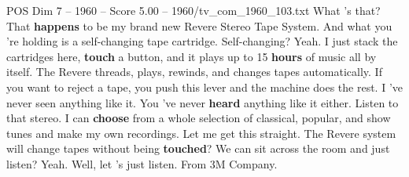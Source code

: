 \begin{textsample}{POS Dim 7 – 1960 – Score 5.00 – 1960/tv\_com\_1960\_103.txt}  \label{ex:f7_pos_022}
What 's that?
That \textbf{happens} to be my brand new Revere Stereo Tape System.
And what you 're holding is a self-changing tape cartridge.
Self-changing?
Yeah.
I just stack the cartridges here, \textbf{touch} a button, and it plays up to 15 \textbf{hours} of music all by itself.
The Revere threads, plays, rewinds, and changes tapes automatically.
If you want to reject a tape, you push this lever and the machine does the rest.
I 've never seen anything like it.
You 've never \textbf{heard} anything like it either.
Listen to that stereo.
I can \textbf{choose} from a whole selection of classical, popular, and show tunes and make my own recordings.
Let me get this straight.
The Revere system will change tapes without being \textbf{touched}?
We can sit across the room and just listen?
Yeah.
Well, let 's just listen.
From 3M Company.

\end{textsample}
